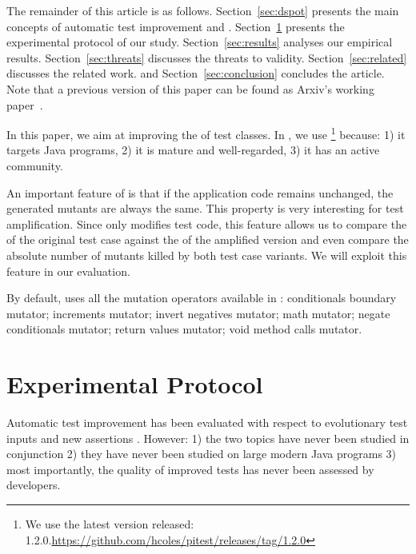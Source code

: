 The remainder of this article is as follows.
Section~\ref{sec:dspot} presents the main concepts of automatic test improvement and \dspot.
Section~\ref{sec:protocol} presents the experimental protocol of our study.
Section~\ref{sec:results} analyses our empirical results. 
Section~\ref{sec:threats} discusses the threats to validity.
Section~\ref{sec:related} discusses the related work.
and Section~\ref{sec:conclusion} concludes the article.
Note that a previous version of this paper can be found as Arxiv's working paper~\cite{BaudryARM15}.

\label{subsub:pitest}
In this paper, we aim at improving the \ms of test classes.  In \dspot, we use \pitest\footnote{We use the latest version released: 1.2.0.\url{https://github.com/hcoles/pitest/releases/tag/1.2.0}} because:
1) it targets Java programs, 
2) it is mature and well-regarded,
3) it has an active community. 

An important feature of \pitest is that if the application code remains unchanged, the generated mutants are always the same.
This property is very interesting for test amplification.
Since \dspot only modifies  test code, this feature allows us to compare the \ms of the original test case against the \ms of the amplified version and even compare the absolute number of mutants killed by both test case variants. 
We will exploit this feature in our evaluation.

By default, \dspot uses all the mutation operators available in \pitest: 
conditionals boundary mutator;
increments mutator;
invert negatives mutator;
math mutator;
negate conditionals mutator;
return values mutator;
void method calls mutator.


\section{Experimental  Protocol}
\label{sec:protocol}

Automatic test improvement has been evaluated with respect to evolutionary test inputs \cite{tonella} and new assertions \cite{TaoXie2006}. However:
1) the two topics have never been studied in conjunction
2) they have never been studied on large modern Java programs
3) most importantly, the quality of improved tests has never been assessed by developers.

